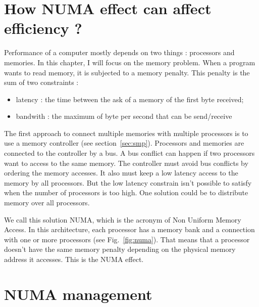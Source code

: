 \section{How NUMA effect can affect efficiency ?}
Performance of a computer mostly depends on two things : processors and memories.
%
In this chapter, I will focus on the memory problem.
%
When a program wants to read memory, it is subjected to a memory penalty.
%
This penalty is the sum of two constraints :
\begin{itemize}
        \item latency : the time between the ask of a memory of the first byte received;
        \item bandwith : the maximum of byte per second that can be send/receive
\end{itemize}

The first approach to connect multiple memories with multiple processors is to use a memory controller (see section~\ref{sec:smp}).
%
Processors and memories are connected to the controller by a bus.
%
A bus conflict can happen if two processors want to access to the same memory.
%
The controller must avoid bus conflicts by ordering the memory accesses.
%
It also must keep a low latency access to the memory by all processors.
%
But the low latency constrain isn't possible to satisfy when the number of processors is too high.
%
One solution could be to distribute memory over all processors.


We call this solution NUMA, which is the acronym of Non Uniform Memory Access.
%
In this architecture, each processor has a memory bank and a connection with one or more processors (see Fig.~\ref{fig:numa}).
%
That means that a processor doesn't have the same memory penalty depending on the physical memory address it accesses.
%
This is the NUMA effect.


\section{NUMA management}

